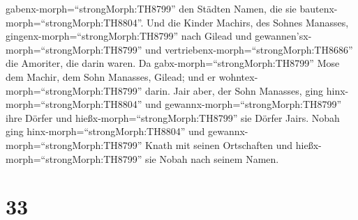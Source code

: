 gabenx-morph=``strongMorph:TH8799'' den Städten Namen, die sie
bautenx-morph=``strongMorph:TH8804''.  Und die Kinder
Machirs, des Sohnes Manasses, gingenx-morph=``strongMorph:TH8799'' nach
Gilead und gewannen'sx-morph=``strongMorph:TH8799'' und
vertriebenx-morph=``strongMorph:TH8686'' die Amoriter, die darin waren.
 Da gabx-morph=``strongMorph:TH8799'' Mose dem Machir, dem
Sohn Manasses, Gilead; und er wohntex-morph=``strongMorph:TH8799''
darin.  Jair aber, der Sohn Manasses, ging
hinx-morph=``strongMorph:TH8804'' und
gewannx-morph=``strongMorph:TH8799'' ihre Dörfer und
hießx-morph=``strongMorph:TH8799'' sie Dörfer Jairs.  Nobah
ging hinx-morph=``strongMorph:TH8804'' und
gewannx-morph=``strongMorph:TH8799'' Knath mit seinen Ortschaften und
hießx-morph=``strongMorph:TH8799'' sie Nobah nach seinem Namen.

\hypertarget{section-32}{%
\section{33}\label{section-32}}

